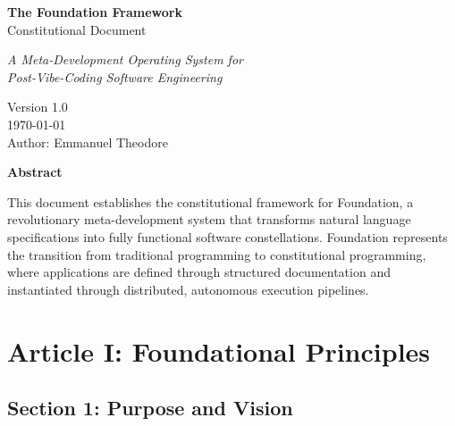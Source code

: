 \documentclass[12pt,letterpaper]{article}
\begin{document}
\begin{titlepage}
    \centering
    \vspace*{2cm}

    {\Huge\bfseries The Foundation Framework\\[0.5cm]}
    {\Large Constitutional Document\\[0.3cm]}

    \vspace{1cm}

    {\Large\itshape A Meta-Development Operating System for\\
    Post-Vibe-Coding Software Engineering\\[2cm]}

    \vspace{2cm}

    {\large Version 1.0\\[0.3cm]}
    {\large \today\\[0.5cm]}
    {\large Author: Emmanuel Theodore\\[2cm]}

    \vfill

    {\large\bfseries Abstract}\\[0.5cm]
    \begin{tcolorbox}[colback=gray!10,colframe=primaryblue,width=0.9\textwidth]
    This document establishes the constitutional framework for Foundation, a revolutionary meta-development system that transforms natural language specifications into fully functional software constellations. Foundation represents the transition from traditional programming to constitutional programming, where applications are defined through structured documentation and instantiated through distributed, autonomous execution pipelines.
    \end{tcolorbox}

\end{titlepage}

\renewcommand{\contentsname}{Table of Contents}
\renewcommand{\cfttoctitlefont}{\huge\bfseries\color{primaryblue}}
\tableofcontents
\newpage

\section{Article I: Foundational Principles}

\subsection{Section 1: Purpose and Vision}
\end{document}
